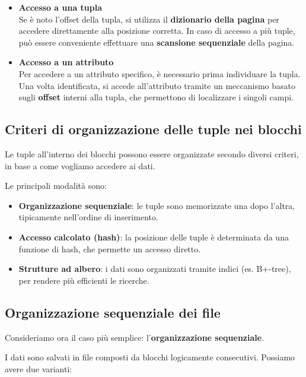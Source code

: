 \begin{itemize}
	\item \textbf{Accesso a una tupla} \\
	Se è noto l'offset della tupla, si utilizza il \textbf{dizionario della pagina} per accedere direttamente alla posizione corretta. 
	In caso di accesso a più tuple, può essere conveniente effettuare una \textbf{scansione sequenziale} della pagina.
	
	\item \textbf{Accesso a un attributo} \\
	Per accedere a un attributo specifico, è necessario prima individuare la tupla. 
	Una volta identificata, si accede all'attributo tramite un meccanismo basato sugli \textbf{offset} interni alla tupla, che permettono di localizzare i singoli campi.
\end{itemize}
\subsection{Criteri di organizzazione delle tuple nei blocchi}

Le tuple all'interno dei blocchi possono essere organizzate secondo diversi criteri, in base a come vogliamo accedere ai dati.

Le principali modalità sono:

\begin{itemize}
	\item \textbf{Organizzazione sequenziale}: le tuple sono memorizzate una dopo l'altra, tipicamente nell'ordine di inserimento.
	
	\item \textbf{Accesso calcolato (hash)}: la posizione delle tuple è determinata da una funzione di hash, che permette un accesso diretto.
	
	\item \textbf{Strutture ad albero}: i dati sono organizzati tramite indici (es. B+-tree), per rendere più efficienti le ricerche.
\end{itemize}

\subsection{Organizzazione sequenziale dei file}

Consideriamo ora il caso più semplice: l'\textbf{organizzazione sequenziale}.

I dati sono salvati in file composti da blocchi logicamente consecutivi.  
Possiamo avere due varianti:

